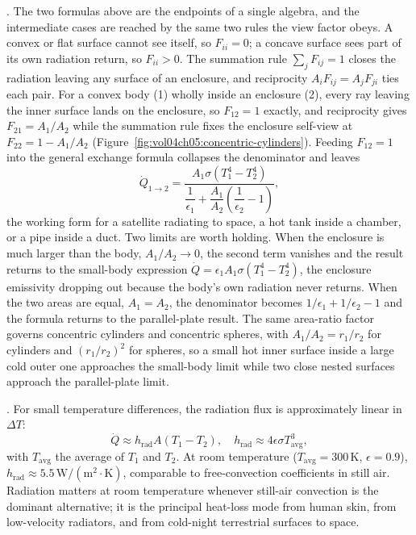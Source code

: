 . The two
formulas above are the endpoints of a single algebra, and the
intermediate cases are reached by the same two rules the view factor
obeys. A convex or flat surface cannot see itself, so $F_{ii} = 0$; a
concave surface sees part of its own radiation return, so $F_{ii} > 0$.
The summation rule $\sum_j F_{ij} = 1$ closes the radiation leaving any
surface of an enclosure, and reciprocity $A_i F_{ij} = A_j F_{ji}$ ties
each pair. For a convex body (1) wholly inside an enclosure (2),
every ray leaving the inner surface lands on the enclosure, so
$F_{12} = 1$ exactly, and reciprocity gives $F_{21} = A_1/A_2$ while the
summation rule fixes the enclosure self-view at
$F_{22} = 1 - A_1/A_2$ (Figure~\ref{fig:vol04ch05:concentric-cylinders}).
Feeding $F_{12} = 1$ into the general exchange formula collapses the
denominator and leaves
\[
\dot{Q}_{1 \to 2} = \frac{A_1 \sigma (T_1^4 - T_2^4)}{
\dfrac{1}{\epsilon_1} + \dfrac{A_1}{A_2}\!\left(\dfrac{1}{\epsilon_2} -
1\right)},
\]
the working form for a satellite radiating to space, a hot tank inside
a chamber, or a pipe inside a duct. Two limits are worth holding. When
the enclosure is much larger than the body, $A_1/A_2 \to 0$, the second
term vanishes and the result returns to the small-body expression
$\dot{Q} = \epsilon_1 A_1 \sigma(T_1^4 - T_2^4)$, the enclosure
emissivity dropping out because the body's own radiation never returns.
When the two areas are equal, $A_1 = A_2$, the denominator becomes
$1/\epsilon_1 + 1/\epsilon_2 - 1$ and the formula returns to the
parallel-plate result. The same area-ratio factor governs concentric
cylinders and concentric spheres, with $A_1/A_2 = r_1/r_2$ for cylinders
and $(r_1/r_2)^2$ for spheres, so a small hot inner surface inside a
large cold outer one approaches the small-body limit while two close
nested surfaces approach the parallel-plate limit.



. For small temperature
differences, the radiation flux is approximately linear in $\Delta T$:
\[
\dot{Q} \approx h_{\text{rad}} A (T_1 - T_2), \quad h_{\text{rad}}
\approx 4 \epsilon \sigma T_{\text{avg}}^3,
\]
with $T_{\text{avg}}$ the average of $T_1$ and $T_2$. At room
temperature ($T_{\text{avg}} = 300\,\si{\kelvin}$, $\epsilon = 0.9$),
$h_{\text{rad}} \approx 5.5\,\text{W}/(\text{m}^2\cdot\si{\kelvin})$,
comparable to free-convection coefficients in still air. Radiation
matters at room temperature whenever still-air convection is the
dominant alternative; it is the principal heat-loss mode from human
skin, from low-velocity radiators, and from cold-night terrestrial
surfaces to space.

